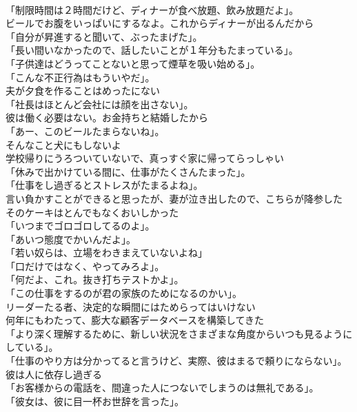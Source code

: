 \documentclass[8pt]{extreport}
\begin{document}
\begin{CJK}{UTF8}{min}
\\	「制限時間は２時間だけど、ディナーが食べ放題、飲み放題だよ」。	
\\	ビールでお腹をいっぱいにするなよ。これからディナーが出るんだから	
\\	「自分が昇進すると聞いて、ぶったまげた」。	
\\	「長い間いなかったので、話したいことが１年分もたまっている」。	
\\	「子供達はどうってことないと思って煙草を吸い始める」。	
\\	「こんな不正行為はもういやだ」。	
\\	夫が夕食を作ることはめったにない	
\\	「社長はほとんど会社には顔を出さない」。	
\\	彼は働く必要はない。お金持ちと結婚したから	
\\	「あー、このビールたまらないね」。	
\\	そんなこと犬にもしないよ	
\\	学校帰りにうろついていないで、真っすぐ家に帰ってらっしゃい	
\\	「休みで出かけている間に、仕事がたくさんたまった」。	
\\	「仕事をし過ぎるとストレスがたまるよね」。	
\\	言い負かすことができると思ったが、妻が泣き出したので、こちらが降参した	
\\	そのケーキはとんでもなくおいしかった	
\\	「いつまでゴロゴロしてるのよ」。	
\\	「あいつ態度でかいんだよ」。	
\\	「若い奴らは、立場をわきまえていないよね」	
\\	「口だけではなく、やってみろよ」。	
\\	「何だよ、これ。抜き打ちテストかよ」。	
\\	「この仕事をするのが君の家族のためになるのかい」。	
\\	リーダーたる者、決定的な瞬間にはためらってはいけない	
\\	何年にもわたって、膨大な顧客データベースを構築してきた	
\\	「より深く理解するために、新しい状況をさまざまな角度からいつも見るようにしている」。	
\\	「仕事のやり方は分かってると言うけど、実際、彼はまるで頼りにならない」。	
\\	彼は人に依存し過ぎる	
\\	「お客様からの電話を、間違った人につないでしまうのは無礼である」。	
\\	「彼女は、彼に目一杯お世辞を言った」。	

\end{CJK}
\end{document}
